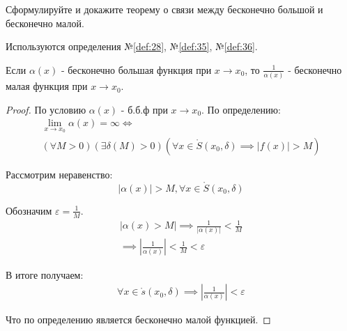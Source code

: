 \begin{question}
    Сформулируйте и докажите теорему о связи между бесконечно большой и бесконечно малой.
\end{question}
\begin{used}
    Используются определения №\ref{def:28}, №\ref{def:35}, №\ref{def:36}.
\end{used}
\begin{theorem}
    Если $\alpha(x)$ - бесконечно большая функция при $x \to x_0$, то $\frac{1}{\alpha(x)}$ - бесконечно малая функция при $x \to x_0$.
\end{theorem}
\begin{proof}
    По условию $\alpha(x)$ - б.б.ф при $x \to x_0$. По определению:
    \begin{gather*}
        \lim_{x \to x_0} \alpha(x) = \infty \iff \\
        (\forall M > 0)(\exists \delta(M) > 0)(\forall x \in \mathring{S}(x_0, \delta) \implies |f(x)| > M)
    \end{gather*}

    Рассмотрим неравенство: \[
        |\alpha(x)| > M, \forall x \in \mathring{S}(x_0, \delta)
    \]

    Обозначим $\varepsilon = \frac{1}{M}$.
    \begin{gather*}
        |\alpha(x) > M| \implies \frac{1}{|\alpha(x)|} < \frac{1}{M} \\
        \implies |\frac{1}{\alpha(x)}| < \frac{1}{M} < \varepsilon
    \end{gather*}

    В итоге получаем:
    \begin{gather*}
        \forall x \in \mathring{s}(x_0, \delta) \implies |\frac{1}{\alpha(x)}| < \varepsilon 
    \end{gather*}

    Что по определению является бесконечно малой функцией.
\end{proof}
\pagebreak



